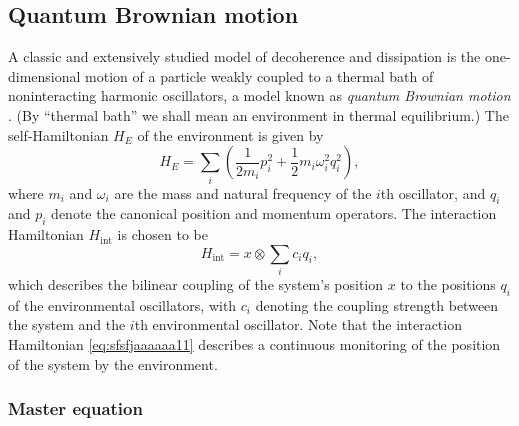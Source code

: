 \documentclass[3p,sort&compress]{elsarticle}
\newcommand{\op}[1]{#1}
\begin{document}
\subsection{\label{sec:quant-brown-moti}Quantum Brownian motion}

A classic and extensively studied model of decoherence and dissipation is the one-dimensional motion of a particle weakly coupled to a thermal bath of noninteracting harmonic oscillators, a model known as \emph{quantum Brownian motion} \cite{Kubler:1973:ux,Caldeira:1983:on,Hu:1992:om,Paz:1993:ta,Zurek:1993:pu,Weiss:1999:tv,Zurek:2002:ii,Breuer:2002:oq,Diosi:2000:yn,Joos:2003:jh,Eisert:2003:ib,Schlosshauer:2007:un}.  (By ``thermal bath'' we shall mean an environment in thermal equilibrium.) The self-Hamiltonian $\op{H}_E$ of the environment is given by
%
\begin{equation}
  \label{eq:sfsfjaa11}
  \op{H}_E = \sum_i \left( \frac{1}{2m_i}p_i^2 +
  \frac{1}{2}m_i\omega_i^2q_i^2 \right),  
\end{equation}
%
where $m_i$ and $\omega_i$ are the mass and natural frequency of the $i$th oscillator, and $q_i$ and $p_i$ denote the canonical position and momentum operators. The interaction Hamiltonian $\op{H}_\text{int}$ is chosen to be
%
\begin{equation}\label{eq:sfsfjaaaaaa11}
\op{H}_\text{int} = x \otimes \sum_i c_i q_i,
\end{equation}
%
which describes the bilinear coupling of the system's position $x$ to the positions $q_i$ of the environmental oscillators, with $c_i$ denoting the coupling strength between the system and the $i$th environmental oscillator. Note that the interaction Hamiltonian \eqref{eq:sfsfjaaaaaa11} describes a continuous monitoring of the position of the system by the environment. 

\subsubsection{Master equation} 
\end{document}
